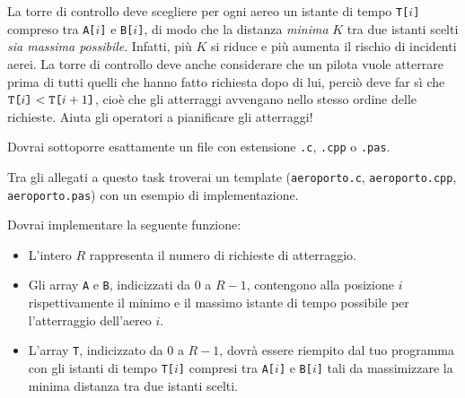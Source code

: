 	La torre di controllo deve scegliere per ogni aereo un istante di tempo \texttt{T[$i$]} compreso tra \texttt{A[$i$]} e \texttt{B[$i$]}, di modo che la distanza \emph{minima} $K$ tra due istanti scelti \emph{sia massima possibile}. Infatti, più $K$ si riduce e più aumenta il rischio di incidenti aerei. La torre di controllo deve anche considerare che un pilota vuole atterrare prima di tutti quelli che hanno fatto richiesta dopo di lui, perciò deve far sì che $\text{\texttt{T[$i$]}}< \text{\texttt{T[$i+1$]}}$, cioè che gli atterraggi avvengano nello stesso ordine delle richieste.
	Aiuta gli operatori a pianificare gli atterraggi!


\Implementation


Dovrai sottoporre esattamente un file con estensione \texttt{.c}, \texttt{.cpp} o \texttt{.pas}.

\begin{warning}
Tra gli allegati a questo task troverai un template (\texttt{aeroporto.c}, \texttt{aeroporto.cpp}, \texttt{aeroporto.pas}) con un esempio di implementazione.
\end{warning}

Dovrai implementare la seguente funzione:

\begin{itemize}[nolistsep]
	
	\begin{itemize}[nolistsep]
	  \item L'intero $R$ rappresenta il numero di richieste di atterraggio.
	  \item Gli array \texttt{A} e \texttt{B}, indicizzati da $0$ a $R-1$, contengono alla posizione $i$ rispettivamente il minimo e il massimo istante di tempo possibile per l'atterraggio dell'aereo $i$.
	  \item L'array \texttt{T}, indicizzato da $0$ a $R-1$, dovrà essere riempito dal tuo programma con gli istanti di tempo \texttt{T[$i$]} compresi tra \texttt{A[$i$]} e \texttt{B[$i$]} tali da massimizzare la minima distanza tra due istanti scelti.
	\end{itemize}
\end{itemize}

